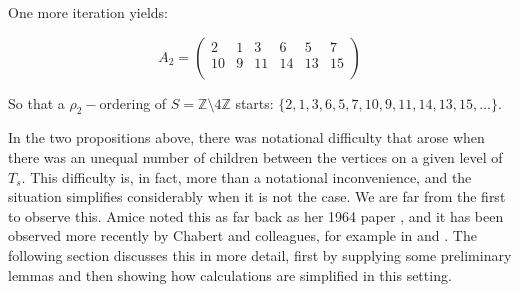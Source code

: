 \begin{example}
One more iteration yields:

\[A_2=
 \begin{pmatrix}
2 & 1 & 3 & 6 & 5 & 7 \\
10 & 9 & 11 & 14 & 13 & 15   \\
\end{pmatrix}
\]

So that a $\rho_2-$ordering of $S=\mathbb{Z} \setminus 4\mathbb{Z}$ starts: $\{2,1,3,6,5,7,10,9,11,14,13,15,\ldots\}$.

\end{example}


In the two propositions above, there was notational difficulty that arose when there was an unequal number of children between the vertices on a given level of $T_s$. This difficulty is, in fact, more than a notational inconvenience, and the situation simplifies considerably when it is not the case. We are far from the first to observe this. Amice noted this as far back as her 1964 paper \cite{amice}, and it has been observed more recently by Chabert and colleagues, for example in \cite{fp} and \cite{cef}. The following section discusses this in more detail, first by supplying some preliminary lemmas and then showing how calculations are simplified in this setting.\\

